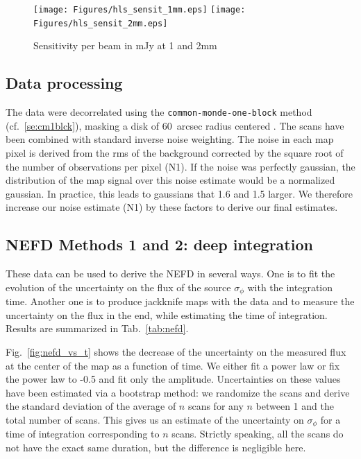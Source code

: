 \begin{figure}[htbp]
\begin{center}
\texttt{[image: Figures/hls\_sensit\_1mm.eps]}
\texttt{[image: Figures/hls\_sensit\_2mm.eps]}
\caption{Sensitivity per beam in mJy at 1 and 2mm}
\label{fig:hls_cov}
\end{center}
\end{figure}


\subsection{Data processing}

The data were decorrelated using the {\tt common-monde-one-block} method
(cf.~\ref{se:cm1blck}), masking a disk of 60~arcsec radius centered \hls.  The
scans have been combined with standard inverse noise weighting. The noise in
each map pixel is derived from the rms of the background corrected by the
square root of the number of observations per pixel (N1). If the noise was perfectly
gaussian, the distribution of the map signal over this noise estimate would be a
normalized gaussian. In practice, this leads to gaussians that 1.6 and 1.5
larger. We therefore increase our noise estimate (N1) by these factors to derive
our final estimates.

\subsection{NEFD Methods 1 and 2: deep integration}
These data can be used to derive the NEFD in several ways. One is to fit the
evolution of the uncertainty on the flux of the source $\sigma_\phi$ with the
integration time. Another one is to produce jackknife maps with the data and to
measure the uncertainty on the flux in the end, while estimating the time of
integration. Results are summarized in Tab.~\ref{tab:nefd}.

Fig.~\ref{fig:nefd_vs_t} shows the decrease of the uncertainty on the measured
flux at the center of the map as a function of time. We either fit a power law
or fix the power law to -0.5 and fit only the amplitude. Uncertainties on these
values have been estimated via a bootstrap method: we randomize the scans and
derive the standard deviation of the average of $n$ scans for any $n$ between 1
and the total number of scans. This gives us an estimate of the uncertainty on
$\sigma_\phi$ for a time of integration corresponding to $n$ scans. Strictly
speaking, all the scans do not have the exact same duration, but the difference
is negligible here.


